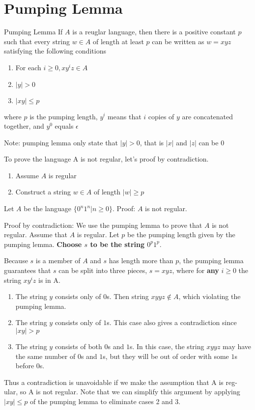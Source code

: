 \section{Pumping Lemma}

\begin{Lemma}{Pumping Lemma}{}
	If $A$ is a reuglar language, then there is a positive constant $p$
	such that every string $w \in A$ of length at least $p$
	can be written as $w = xyz$ satisfying the following conditions
	\begin{enumerate}
		\item For each $i \geqslant 0, xy^{i}z \in A$
		\item $|y| > 0$
		\item $|xy| \leqslant p$
	\end{enumerate}
	where $p$ is the pumping length,
	$y^{i}$ means that $i$ copies of $y$ are concatenated together, and $y^0$ equals $\epsilon$

	Note: pumping lemma only state that $|y| > 0$, that is $|x|$ and $|z|$ can be $0$
\end{Lemma}

To prove the language A is not regular,
let's proof by contradiction.
\begin{enumerate}
	\item Assume $A$ is regular
	\item Construct a string $w \in A$ of length $|w| \geqslant p$
\end{enumerate}

\begin{Example}{}{}
	Let $A$ be the language $\{0^{n}1^{n} | n \geqslant 0\}$. Proof: $A$ is not regular.
\end{Example}

Proof by contradiction: We use the pumping lemma to prove that $A$ is not regular.
Assume that $A$ is regular. Let $p$ be the pumping length given by the pumping lemma. \textbf{Choose $s$ to be the string $0^p1^p$}.

Because $s$ is a member of $A$ and $s$ has length more than $p$,
the pumping lemma guarantees that $s$ can be split into three pieces,
$s = xyz$, where for \textbf{any} $i \geqslant 0$ the string $xy^{i}z$ is in A.
\begin{enumerate}
	\item The string $y$ consists only of $0$s.
	      Then string $xyyz \notin A$, which violating the pumping lemma.
	\item The string $y$ consists only of $1$s. This case also gives a contradiction since $|xy| > p$
	\item The string $y$ consists of both $0$s and $1$s.
	      In this case, the string $xyyz$ may have the same number of $0$s and $1$s, but they will be out of order with some $1$s before $0$s.
\end{enumerate}
Thus a contradiction is unavoidable if we make the assumption that A is reg- ular, so A is not regular.
Note that we can simplify this argument by applying $|xy| \leqslant p$ of the pumping lemma to eliminate cases 2 and 3.